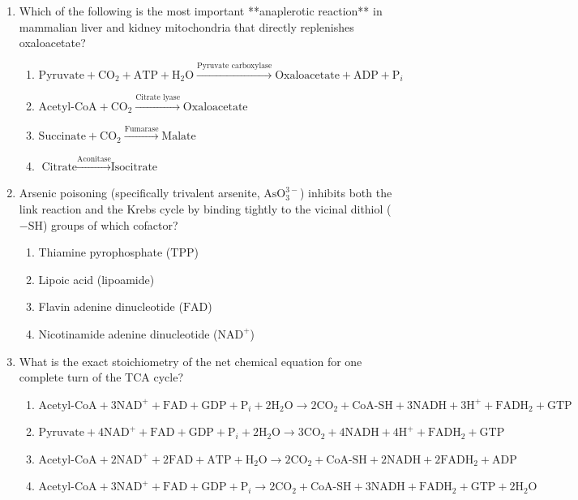 \documentclass[11pt, a4paper]{article}
\begin{document}
\begin{enumerate}[label=\textbf{\arabic*.}]
\item Which of the following is the most important **anaplerotic reaction** in mammalian liver and kidney mitochondria that directly replenishes oxaloacetate?
\begin{enumerate}[label=(\Alph*)]
    \item $\text{Pyruvate} + \text{CO}_2 + \text{ATP} + \text{H}_2\text{O} \xrightarrow{\text{Pyruvate carboxylase}} \text{Oxaloacetate} + \text{ADP} + \text{P}_i$
    \item $\text{Acetyl-CoA} + \text{CO}_2 \xrightarrow{\text{Citrate lyase}} \text{Oxaloacetate}$
    \item $\text{Succinate} + \text{CO}_2 \xrightarrow{\text{Fumarase}} \text{Malate}$
    \item $\text{Citrate} \xrightarrow{\text{Aconitase}} \text{Isocitrate}$
\end{enumerate}

\item Arsenic poisoning (specifically trivalent arsenite, $\text{AsO}_3^{3-}$) inhibits both the link reaction and the Krebs cycle by binding tightly to the vicinal dithiol ($-\text{SH}$) groups of which cofactor?
\begin{enumerate}[label=(\Alph*)]
    \item Thiamine pyrophosphate ($\text{TPP}$)
    \item Lipoic acid (lipoamide)
    \item Flavin adenine dinucleotide ($\text{FAD}$)
    \item Nicotinamide adenine dinucleotide ($\text{NAD}^+$)
\end{enumerate}

\item What is the exact stoichiometry of the net chemical equation for one complete turn of the TCA cycle?
\begin{enumerate}[label=(\Alph*)]
    \item $\text{Acetyl-CoA} + 3\text{NAD}^+ + \text{FAD} + \text{GDP} + \text{P}_i + 2\text{H}_2\text{O} \rightarrow 2\text{CO}_2 + \text{CoA-SH} + 3\text{NADH} + 3\text{H}^+ + \text{FADH}_2 + \text{GTP}$
    \item $\text{Pyruvate} + 4\text{NAD}^+ + \text{FAD} + \text{GDP} + \text{P}_i + 2\text{H}_2\text{O} \rightarrow 3\text{CO}_2 + 4\text{NADH} + 4\text{H}^+ + \text{FADH}_2 + \text{GTP}$
    \item $\text{Acetyl-CoA} + 2\text{NAD}^+ + 2\text{FAD} + \text{ATP} + \text{H}_2\text{O} \rightarrow 2\text{CO}_2 + \text{CoA-SH} + 2\text{NADH} + 2\text{FADH}_2 + \text{ADP}$
    \item $\text{Acetyl-CoA} + 3\text{NAD}^+ + \text{FAD} + \text{GDP} + \text{P}_i \rightarrow 2\text{CO}_2 + \text{CoA-SH} + 3\text{NADH} + \text{FADH}_2 + \text{GTP} + 2\text{H}_2\text{O}$
\end{enumerate}


\end{enumerate}
\end{document}
